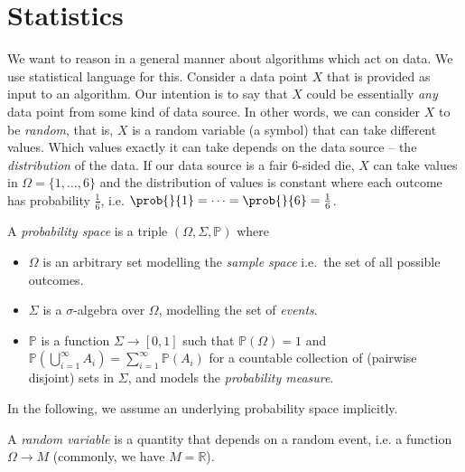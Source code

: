 \documentclass[
    a4paper, %
	fontsize=10pt, %
	twoside=false, %
]{kaobook}
\begin{document}


\section{Statistics}

We want to reason in a general manner about algorithms which act on data. We use statistical language for this. Consider a data point $X$ that is provided as input to an algorithm. Our intention is to say that $X$ could be essentially \textit{any} data point from some kind of data source. In other words, we can consider $X$ to be \textit{random}, that is, $X$ is a random variable (a symbol) that can take different values. 
Which values exactly it can take depends on the data source -- the \textit{distribution} of the data. If our data source is a fair $6$-sided die, $X$ can take values in $\Omega = \{ 1, \dots, 6 \}$ and the distribution of values is constant where each outcome has probability $\frac{1}{6}$, i.e. $\prob{}{1} = \dots  = \prob{}{6} = \frac{1}{6}$.
\begin{definition}
  A \textit{probability space} is a triple \((\Omega, \Sigma, \mathbb{P})\)
  where
  \begin{itemize}
  \item \(\Omega\) is an arbitrary set modelling the \textit{sample space}
    i.e.~the set of all possible outcomes.
  \item \(\Sigma\) is a \(\sigma\)-algebra
    over \(\Omega\), modelling the set of \textit{events}.
    \item \(\mathbb{P}\) is a function
    \(\Sigma \to [0,1]\) such that \(\mathbb{P}(\Omega)=1\) and
    \(\mathbb{P}\left( \bigcup_{i=1}^\infty A_{i} \right) = \sum_{i=1}^\infty
    \mathbb{P}(A_{i})\) for a countable collection of (pairwise disjoint) sets
    in \(\Sigma\), and models the \textit{probability measure}.
  \end{itemize}
\end{definition}
In the following, we assume an underlying probability space implicitly.
\begin{definition}
  A \textit{random variable} is a quantity
  that depends on a random event, i.e. a function \(\Omega
  \to M\) (commonly, we have \(M=\mathbb{R}\)).
\end{definition}
\end{document}
